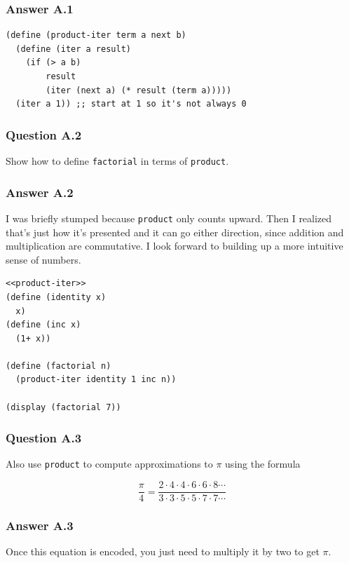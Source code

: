 \documentclass[final,fleqn,titlepage,twoside]{article}
\begin{document}
\subsubsection{Answer A.1}
\label{sec:org41beef6}
\begin{verbatim}
(define (product-iter term a next b)
  (define (iter a result)
    (if (> a b)
        result
        (iter (next a) (* result (term a)))))
  (iter a 1)) ;; start at 1 so it's not always 0
\end{verbatim}

\subsubsection{Question A.2}
\label{sec:org5a3a80c}
Show how to define \texttt{factorial} in terms of \texttt{product}.

\subsubsection{Answer A.2}
\label{sec:orge156abb}
I was briefly stumped because \texttt{product} only counts upward. Then I
realized that's just how it's presented and it can go either direction, since
addition and multiplication are commutative. I look forward to building up a
more intuitive sense of numbers.
\begin{verbatim}
<<product-iter>>
(define (identity x)
  x)
(define (inc x)
  (1+ x))

(define (factorial n)
  (product-iter identity 1 inc n))

(display (factorial 7))
\end{verbatim}

\subsubsection{Question A.3}
\label{sec:org3f9b91b}
Also use \texttt{product} to compute approximations to \(\pi\) using the
formula

\[
\frac{\pi}{4} =
\frac{2\cdot 4\cdot 4\cdot 6\cdot 6\cdot 8\cdots}{3\cdot 3\cdot 5\cdot 5\cdot 7\cdot 7\cdots}
\]

\subsubsection{Answer A.3}
\label{sec:org96e1402}
Once this equation is encoded, you just need to multiply it by two to get \(\pi\).
\end{document}

